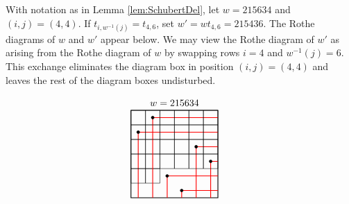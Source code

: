 \documentclass[ALCO,Unicode,published]{cedram}
\begin{document}
\begin{example}
With notation as in Lemma \ref{lem:SchubertDel}, let $w = 215634$ and $(i,j) = (4,4)$.  If $t_{i,w^{-1}(j)} = t_{4,6}$, set $w' = wt_{4,6} = 215436$.  The Rothe diagrams of $w$ and $w'$ appear below.  We may view the Rothe diagram of $w'$ as arising from the Rothe diagram of $w$ by swapping rows $i=4$ and $w^{-1}(j)=6$.  This exchange eliminates the diagram box in position $(i,j) = (4,4)$ and leaves the rest of the diagram boxes undisturbed.

\[
 \begin{minipage}{.4\textwidth}
\hspace{0.5cm} 
  \begin{tikzpicture}[x=1.5em,y=1.5em]
      \draw[color=black, thick](0,1)rectangle(6,7);
           \node at (3,7.5) {$w = 215634$};
     \draw[color=black](0,6)rectangle(1,7);
      \draw[color=black](1,6)rectangle(2,7);
      \draw[color=black](1,4)rectangle(2,5);
      \draw[color=black](3,4)rectangle(4,5);
       \draw[color=black](1,3)rectangle(2,4);
      \draw[color=black](3,3)rectangle(4,4);
      \draw[color=black](1,2)rectangle(2,3);      
     \draw[thick,color=red] (6,6.5)--(1.5,6.5)--(1.5,1);
     \draw[thick,color=red] (6,5.5)--(0.5,5.5)--(0.5,1);
     \draw[thick,color=red] (6,4.5)--(4.5,4.5)--(4.5,1);
     \draw[thick,color=red] (6,3.5)--(5.5,3.5)--(5.5,1);
     \draw[thick,color=red] (6,2.5)--(2.5,2.5)--(2.5,1);
     \draw[thick,color=red] (6,1.5)--(3.5,1.5)--(3.5,1);
     \filldraw [black](1.5,6.5)circle(.1);
     \filldraw [black](0.5,5.5)circle(.1);
      \filldraw [black](4.5,4.5)circle(.1);
     \filldraw [black](5.5,3.5)circle(.1);
     \filldraw [black](2.5,2.5)circle(.1);
      \filldraw [black](3.5,1.5)circle(.1);
      \draw[color=black](2,6)rectangle(3,7);
      \draw[color=black](3,6)rectangle(4,7); 
      \draw[color=black](4,6)rectangle(5,7);
      \draw[color=black](5,6)rectangle(6,7); 
      \draw[color=black](0,5)rectangle(1,6);
      \draw[color=black](1,5)rectangle(2,6);  
      \draw[color=black](2,5)rectangle(3,6);
      \draw[color=black](3,5)rectangle(4,6); 
      \draw[color=black](4,5)rectangle(5,6);
      \draw[color=black](5,5)rectangle(6,6); 
     \draw[color=black](0,4)rectangle(1,5); 
      \draw[color=black](2,4)rectangle(3,5);
      \draw[color=black](4,4)rectangle(5,5);
      \draw[color=black](5,4)rectangle(6,5); 
      \draw[color=black](0,3)rectangle(1,4); 
      \draw[color=black](2,3)rectangle(3,4);
      \draw[color=black](4,3)rectangle(5,4);
      \draw[color=black](5,3)rectangle(6,4); 
      \draw[color=black](0,2)rectangle(1,3); 

\end{tikzpicture}
\end{minipage}\]
\end{example}
\end{document}
